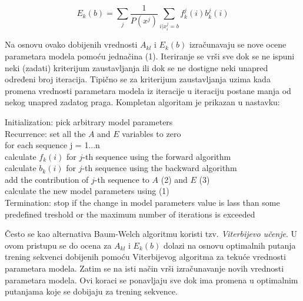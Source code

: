 \documentclass[a4paper, 12pt]{article}
\begin{document}
\begin{equation}\label{eq:pythagoras}
E_k(b) = \sum_{j}\frac{1}{P(x^j)}\sum_{i|x_i^j=b}f_k^j(i)b_k^j(i)
\end{equation}

\noindent Na osnovu ovako dobijenih vrednosti $A_{kl}$ i $E_k(b)$ izračunavaju se nove ocene parametara modela pomoću jednačina (1). Iteriranje se vrši sve dok se ne ispuni neki (zadati) kriterijum zaustavljanja ili dok se ne dostigne neki unapred određeni broj iteracija. Tipično se za kriterijum zaustavljanja uzima kada promena vrednosti parametara modela iz iteracije u iteraciju postane manja od nekog unapred zadatog praga.
Kompletan algoritam je prikazan u nastavku:

\begin{algorithm}[h!] 
 \vspace*{0.2cm}
 Initialization: pick arbitrary model parameters \\
 \vspace*{0.2cm}
 Recurrence: \hspace{0.25cm} set all the $A$ and $E$ variables to zero \\
 	     \hspace{2.5cm} for each sequence j = 1...n \\
             \hspace{3.3cm} calculate $f_k(i)$ for $j$-th sequence using the forward algorithm \\
             \hspace{3.3cm} calculate $b_k(i)$ for $j$-th sequence using the backward algorithm \\
             \hspace{3.3cm} add the contribution of $j$-th sequence to $A$ (2) and $E$ (3) \\
             \hspace{2.5cm} calculate the new model parameters using (1) \\ 
 \vspace*{0.2cm}
 Termination: \hspace{0.05cm} stop if the change in model parameters value is lass than some \\
              \hspace{2.5cm} predefined treshold or the maximum number of iterations is exceeded \\
\end{algorithm}

Često se kao alternativa Baum-Welch algoritmu koristi tzv. \textit{Viterbijevo učenje}. U ovom pristupu se do ocena za $A_{kl}$ i $E_k(b)$ dolazi na osnovu optimalnih putanja trening sekvenci dobijenih pomoću Viterbijevog algoritma za tekuće vrednosti parametara modela. Zatim se na isti način vrši izračunavanje novih vrednosti parametara modela. Ovi koraci se ponavljaju sve dok ima promena u optimalnim putanjama koje se dobijaju za trening sekvence. \\
\end{document}
